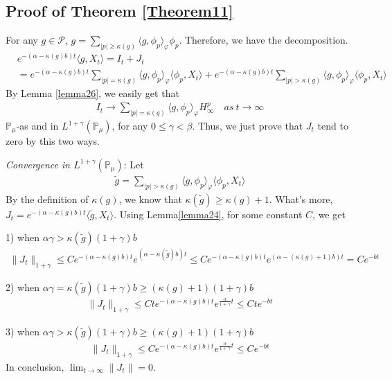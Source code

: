 \documentclass[12pt, a4paper]{amsart}
\theoremstyle{definition}
\numberwithin{equation}{section}
\begin{document}
\subsection{Proof of Theorem \ref{Theorem11}}
For any $g\in \mathcal{P}$, $g=\sum_{|p|\geq \kappa(g)}\langle g,\phi_p\rangle_\varphi \phi_p$. Therefore, we have the decomposition.
\begin{align*}
    &e^{-(\alpha-\kappa(g)b)t}\langle g,X_t\rangle=I_t+J_t\\
    &=e^{-(\alpha-\kappa(g)b)t}\sum_{|p|= \kappa(g)}\langle g,\phi_p\rangle_\varphi \langle \phi_p,X_t\rangle+e^{-(\alpha-\kappa(g)b)t}\sum_{|p|> \kappa(g)}\langle g,\phi_p\rangle_\varphi \langle \phi_p,X_t\rangle
\end{align*}
By Lemma \ref{lemma26}, we easily get that
\begin{align*}
    I_t \rightarrow \sum_{|p|=\kappa(g)}\langle g, \phi_p\rangle_{\varphi} H_{\infty}^p  \quad as~ t\rightarrow \infty
\end{align*}
$\mathbb{P}_{\mu}$-as and in $L^{1+\gamma}(\mathbb{P}_{\mu})$, for any $0\leq \gamma<\beta$. Thus, we just prove that $J_t$ tend to zero by this two ways.

{\em Convergence in $L^{1+\gamma}(\mathbb{P}_{\mu})$}:
Let
\begin{align*}
    \tilde{g}=\sum_{|p|> \kappa(g)}\langle g,\phi_p\rangle_\varphi \langle \phi_p,X_t\rangle
\end{align*}
By the definition of $\kappa(g)$, we know that $\kappa(\tilde{g})\geq \kappa(g)+1$. What's more, $J_t=e^{-(\alpha-\kappa(g)b)t}\langle \tilde{g},X_t\rangle$.
Using Lemma\ref{lemma24}, for some constant $C$, we get

1) when $\alpha\gamma>\kappa(\tilde{g})(1+\gamma)b$
\begin{align*}
    \|J_t\|_{1+\gamma}\leq C e^{-(\alpha-\kappa(g)b)t}e^{(\alpha-\kappa(\tilde{g})b)t}\leq C  e^{-(\alpha-\kappa(g)b)t}e^{(\alpha-(\kappa(g)+1)b)t}=C e^{-bt}
\end{align*}

2) when $\alpha\gamma=\kappa(\tilde{g})(1+\gamma)b\geq (\kappa(g)+1)(1+\gamma)b$
\begin{align*}
     \|J_t\|_{1+\gamma}\leq C t e^{-(\alpha-\kappa(g)b)t}e^{\frac{\alpha}{1+\gamma}t}\leq C t e^{-bt}
\end{align*}

3) when $\alpha\gamma>\kappa(\tilde{g})(1+\gamma)b\geq (\kappa(g)+1)(1+\gamma)b$
\begin{align*}
    \|J_t\|_{1+\gamma}\leq C e^{-(\alpha-\kappa(g)b)t}e^{\frac{\alpha}{1+\gamma}t}\leq C e^{-bt}
\end{align*}
In conclusion, $\lim_{t\rightarrow \infty}\|J_t\|=0$.
\end{document}
